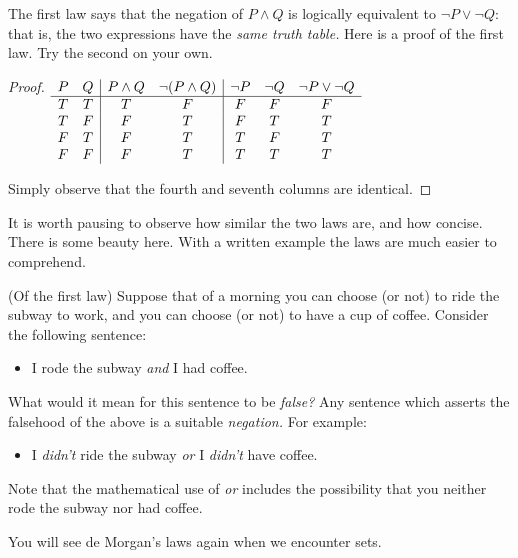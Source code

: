 \noindent The first law says that the negation of $P\wedge Q$ is logically equivalent to $\neg P\vee\neg Q$: that is, the two expressions have the \emph{same truth table.} Here is a proof of the first law. Try the second on your own.

\begin{proof}
$\begin{array}[t]{cc|cc|ccc}
P & Q & P\wedge Q & \neg(P\wedge Q) & \neg P & \neg Q & \neg P\vee\neg Q\\\hline
T & T & T & F & F & F & F\\
T & F & F & T & F & T & T\\
F & T & F & T & T & F & T\\
F & F & F & T & T & T & T
\end{array}$

Simply observe that the fourth and seventh columns are identical.
\end{proof}

\noindent It is worth pausing to observe how similar the two laws are, and how concise. There is some beauty here. With a written example the laws are much easier to comprehend. 

\begin{example}
(Of the first law) Suppose that of a morning you can choose (or not) to ride the subway to work, and you can choose (or not) to have a cup of coffee. Consider the following sentence:
\begin{itemize}\setlength{\itemsep}{0pt}
  \item[] I rode the subway \emph{and} I had coffee.
\end{itemize}
What would it mean for this sentence to be \emph{false?} Any sentence which asserts the falsehood of the above is a suitable \emph{negation.} For example:
\begin{itemize}\setlength{\itemsep}{0pt}
  \item[] I \emph{didn't} ride the subway \emph{or} I \emph{didn't} have coffee.
\end{itemize}
Note that the mathematical use of \emph{or} includes the possibility that you neither rode the subway nor had coffee.
\end{example}

\noindent You will see de Morgan's laws again when we encounter sets.\pagebreak

